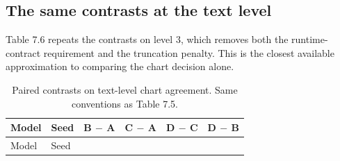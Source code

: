 \subsection{The same contrasts at the text level}

Table 7.6 repeats the contrasts on level 3, which removes both the runtime-contract requirement and the truncation penalty. This is the closest available approximation to comparing the chart decision alone.

\begin{landscape}
\begingroup\scriptsize\setlength{\tabcolsep}{3pt}\sloppy
\begin{longtable}[]{@{}
  >{\raggedright\arraybackslash}p{}
  >{\raggedleft\arraybackslash}p{}
  >{\raggedright\arraybackslash}p{}
  >{\raggedright\arraybackslash}p{}
  >{\raggedright\arraybackslash}p{}
  >{\raggedright\arraybackslash}p{}@{}}
\caption{Paired contrasts on text-level chart agreement. Same conventions as Table 7.5.}\tabularnewline
\toprule\noalign{}
\begin{minipage}[b]{\linewidth}\raggedright
Model
\end{minipage} & \begin{minipage}[b]{\linewidth}\raggedleft
Seed
\end{minipage} & \begin{minipage}[b]{\linewidth}\raggedright
B \ensuremath{-} A
\end{minipage} & \begin{minipage}[b]{\linewidth}\raggedright
C \ensuremath{-} A
\end{minipage} & \begin{minipage}[b]{\linewidth}\raggedright
D \ensuremath{-} C
\end{minipage} & \begin{minipage}[b]{\linewidth}\raggedright
D \ensuremath{-} B
\end{minipage} \\
\midrule\noalign{}
\endfirsthead
\toprule\noalign{}
\begin{minipage}[b]{\linewidth}\raggedright
Model
\end{minipage} & \begin{minipage}[b]{\linewidth}\raggedleft
Seed
\end{minipage} & \begin{minipage}[b]{\linewidth}\raggedright

\end{minipage}
\end{longtable}
\end{landscape}
